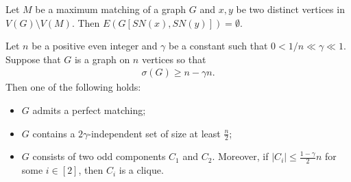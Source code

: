 \documentclass[10pt,a4paper]{amsart}
\begin{document}
\begin{fact}\label{MMProperty}
   Let $M$ be a maximum matching of a graph $G$ and $x,y$ be two distinct vertices in $V(G)\setminus V(M)$. %
   Then $E(G[SN(x),SN(y)])=\emptyset$. %
\end{fact}

\begin{proposition}\label{PMatching}
Let $n$ be a positive even integer and $\gamma$ be a constant such that $0<{1}/{n}\ll\gamma\ll 1$. Suppose that $G$ is a graph on $n$ vertices so that 
\begin{align}\label{B2Ore}
\sigma(G)\ge n-\gamma n.
\end{align}
Then one of the following holds:
\begin{itemize}
\setlength{\parskip}{0pt}
    \item[{\rm (i)}] $G$ admits a perfect matching;
    \item[{\rm (ii)}] $G$ contains a $2\gamma$-independent set of size at least $\frac{n}{2}$;
    \item[{\rm (iii)}] $G$ consists of two odd components $C_1$ and $C_2$. Moreover, if $|C_i|\leq \frac{1-\gamma}{2}n$ for some $i\in [2]$, then %
    $C_i$ is a clique.
\end{itemize}
\end{proposition}
\end{document}

